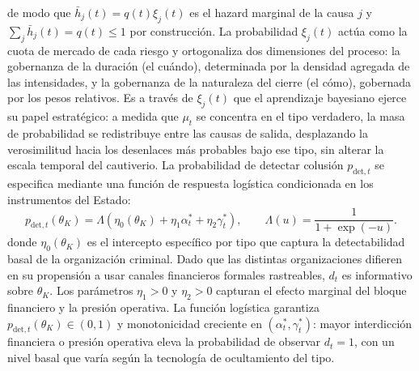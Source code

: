 \documentclass[review,authoryear,12pt]{elsarticle}
\theoremstyle{plain}
\theoremstyle{definition}
\newcommand{\1}{\mathbf{1}}
\begin{document}
de modo que $\bar h_j(t)=q(t)\xi_j(t)$ es el hazard marginal de la causa $j$ y $\sum_j \bar h_j(t)=q(t)\leq 1$ por construcción. La probabilidad $\xi_j(t)$ actúa como la cuota de mercado de cada riesgo y ortogonaliza dos dimensiones del proceso: la gobernanza de la duración (el cuándo), determinada por la densidad agregada de las intensidades, y la gobernanza de la naturaleza del cierre (el cómo), gobernada por los pesos relativos. Es a través de $\xi_j(t)$ que el aprendizaje bayesiano ejerce su papel estratégico: a medida que $\mu_t$ se concentra en el tipo verdadero, la masa de probabilidad se redistribuye entre las causas de salida, desplazando la verosimilitud hacia los desenlaces más probables bajo ese tipo, sin alterar la escala temporal del cautiverio. La probabilidad de detectar colusión $p_{\mathrm{det},t}$ se especifica mediante una función de respuesta logística condicionada en los instrumentos del Estado:
\begin{equation}
p_{\mathrm{det},t}(\theta_K)=\Lambda(\eta_0(\theta_K)+\eta_1\alpha_t^\ast+\eta_2\gamma_t^\ast),\qquad\Lambda(u)=\frac{1}{1+\exp(-u)}.
\label{eq:detection}
\end{equation}
donde $\eta_0(\theta_K)$ es el intercepto específico por tipo que captura la detectabilidad basal de la organización criminal. Dado que las distintas organizaciones difieren en su propensión a usar canales financieros formales rastreables, $d_t$ es informativo sobre $\theta_K$. Los parámetros $\eta_1>0$ y $\eta_2>0$ capturan el efecto marginal del bloque financiero y la presión operativa. La función logística garantiza $p_{\mathrm{det},t}(\theta_K)\in(0,1)$ y monotonicidad creciente en $(\alpha_t^\ast,\gamma_t^\ast)$: mayor interdicción financiera o presión operativa eleva la probabilidad de observar $d_t=1$, con un nivel basal que varía según la tecnología de ocultamiento del tipo.
\end{document}
